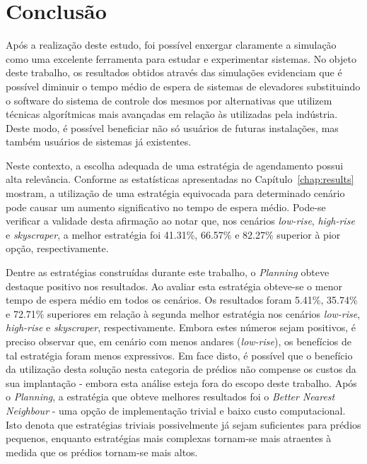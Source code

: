 \chapter{\label{chap:conclusion}Conclusão}

Após a realização deste estudo, foi possível enxergar claramente a simulação
como uma excelente ferramenta para estudar e experimentar sistemas. No objeto
deste trabalho, os resultados obtidos através das simulações evidenciam que é
possível diminuir o tempo médio de espera de sistemas de elevadores substituindo
o software do sistema de controle dos mesmos por alternativas que utilizem
técnicas algorítmicas mais avançadas em relação às utilizadas pela indústria.
Deste modo, é possível beneficiar não só usuários de futuras instalações, mas
também usuários de sistemas já existentes.

Neste contexto, a escolha adequada de uma estratégia de agendamento possui alta
relevância. Conforme as estatísticas apresentadas no Capítulo~\ref{chap:results}
mostram, a utilização de uma estratégia equivocada para determinado cenário pode
causar um aumento significativo no tempo de espera médio. Pode-se verificar a
validade desta afirmação ao notar que, nos cenários \textit{low-rise}, \textit
{high-rise} e \textit{skyscraper}, a melhor estratégia foi 41.31\%, 66.57\% e
82.27\% superior à pior opção, respectivamente.

Dentre as estratégias construídas durante este trabalho, o \textit{Planning}
obteve destaque positivo nos resultados. Ao avaliar esta estratégia obteve-se o
menor tempo de espera médio em todos os cenários. Os resultados foram 5.41\%,
35.74\% e 72.71\% superiores em relação à segunda melhor estratégia nos cenários
\textit{low-rise}, \textit{high-rise} e \textit{skyscraper}, respectivamente.
Embora estes números sejam positivos, é preciso observar que, em cenário com
menos andares (\textit{low-rise}), os benefícios de tal estratégia foram menos
expressivos. Em face disto, é possível que o benefício da utilização desta
solução nesta categoria de prédios não compense os custos da sua implantação -
embora esta análise esteja fora do escopo deste trabalho. Após o
\textit{Planning}, a estratégia que obteve melhores resultados foi o
\textit{Better Nearest Neighbour} - uma opção de implementação trivial e baixo
custo computacional. Isto denota que estratégias triviais possivelmente já sejam
suficientes para prédios pequenos, enquanto estratégias mais complexas tornam-se
mais atraentes à medida que os prédios tornam-se mais altos.

